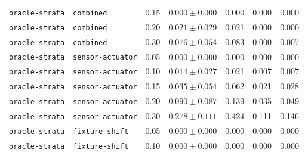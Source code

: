 \documentclass{article}
\begin{document}
\begin{center}
\begin{tabular}{lllcccc}
\texttt{oracle-strata} & \texttt{combined} & 0.15 & $0.000 \pm 0.000$ & 0.000 & 0.000 & 0.000 \\
\texttt{oracle-strata} & \texttt{combined} & 0.20 & $0.021 \pm 0.029$ & 0.021 & 0.000 & 0.000 \\
\texttt{oracle-strata} & \texttt{combined} & 0.30 & $0.076 \pm 0.054$ & 0.083 & 0.000 & 0.007 \\
\texttt{oracle-strata} & \texttt{sensor-actuator} & 0.05 & $0.000 \pm 0.000$ & 0.000 & 0.000 & 0.000 \\
\texttt{oracle-strata} & \texttt{sensor-actuator} & 0.10 & $0.014 \pm 0.027$ & 0.021 & 0.007 & 0.007 \\
\texttt{oracle-strata} & \texttt{sensor-actuator} & 0.15 & $0.035 \pm 0.054$ & 0.062 & 0.021 & 0.028 \\
\texttt{oracle-strata} & \texttt{sensor-actuator} & 0.20 & $0.090 \pm 0.087$ & 0.139 & 0.035 & 0.049 \\
\texttt{oracle-strata} & \texttt{sensor-actuator} & 0.30 & $0.278 \pm 0.111$ & 0.424 & 0.111 & 0.146 \\
\texttt{oracle-strata} & \texttt{fixture-shift} & 0.05 & $0.000 \pm 0.000$ & 0.000 & 0.000 & 0.000 \\
\texttt{oracle-strata} & \texttt{fixture-shift} & 0.10 & $0.000 \pm 0.000$ & 0.000 & 0.000 & 0.000 \\
\bottomrule
\end{tabular}
\end{center}
\end{document}
